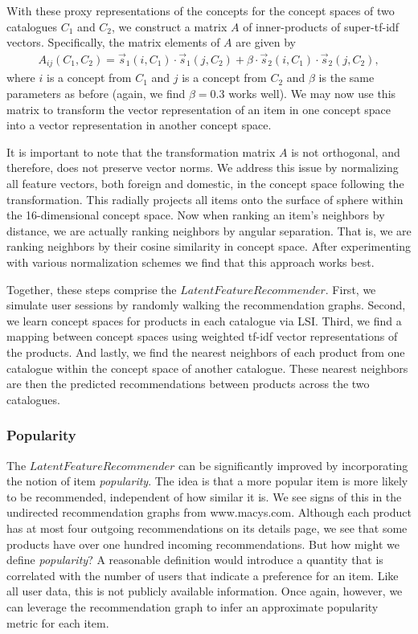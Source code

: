 \documentclass[11pt]{article}
\begin{document}
With these proxy representations of the concepts for the concept spaces of two
catalogues $C_1$ and $C_2$, we construct a matrix $A$ of inner-products of
super-tf-idf vectors.  Specifically, the matrix elements of $A$ are given by
\begin{align}
A_{ij}(C_1,C_2) = \vec{s}_1(i,C_1) \cdot \vec{s}_1(j,C_2) + \beta \cdot
\vec{s}_2(i,C_1) \cdot \vec{s}_2(j,C_2),
\end{align}
where $i$ is a concept from $C_1$ and $j$ is a concept from $C_2$ and $\beta$ is
the same parameters as before (again, we find $\beta=0.3$ works well).  We may
now use this matrix to transform the vector representation of an item in one
concept space into a vector representation in another concept space.

It is important to note that the transformation matrix $A$ is not orthogonal, and
therefore, does not preserve vector norms. We address this issue by normalizing
all feature vectors, both foreign and domestic, in the concept space following
the transformation. This radially projects all items onto the surface of sphere
within the 16-dimensional concept space. Now when ranking an item's neighbors by
distance, we are actually ranking neighbors by angular separation. That is, we
are ranking neighbors by their cosine similarity in concept space. After
experimenting with various normalization schemes we find that this approach
works best.

Together, these steps comprise the $LatentFeatureRecommender$. First, we
simulate user sessions by randomly walking the recommendation graphs. Second, we
learn concept spaces for products in each catalogue via LSI. Third, we find a
mapping between concept spaces using weighted tf-idf vector representations of
the products. And lastly, we find the nearest neighbors of each product from one
catalogue within the concept space of another catalogue. These nearest neighbors
are then the predicted recommendations between products across the two
catalogues.

\subsubsection*{Popularity}
The $LatentFeatureRecommender$ can be significantly improved by incorporating
the notion of item {\em popularity}. The idea is that a more popular item is
more likely to be recommended, independent of how similar it is. We see signs of
this in the undirected recommendation graphs from www.macys.com. Although each
product has at most four outgoing recommendations on its details page, we see
that some products have over one hundred incoming recommendations. But how
might we define {\em popularity}? A reasonable definition would introduce a
quantity that is correlated with the number of users that indicate a preference
for an item. Like all user data, this is not publicly available information.
Once again, however, we can leverage the recommendation graph to infer an
approximate popularity metric for each item.
\end{document}
